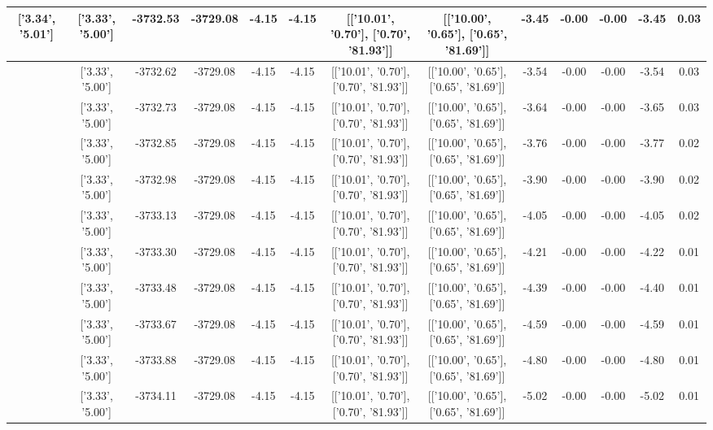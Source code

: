\begin{table}[htbp]
\begin{adjustbox}{angle=90}
\begin{tabular}{|c|c|c|c|c|c|c|c|c|c|c|c|c|}
 ['3.34', '5.01'] & ['3.33', '5.00'] & -3732.53 & -3729.08 & -4.15 & -4.15 & [['10.01', '0.70'], ['0.70', '81.93']] & [['10.00', '0.65'], ['0.65', '81.69']] & -3.45 & -0.00 & -0.00 & -3.45 & 0.03\\ \hline
 ['3.34', '5.01'] & ['3.33', '5.00'] & -3732.62 & -3729.08 & -4.15 & -4.15 & [['10.01', '0.70'], ['0.70', '81.93']] & [['10.00', '0.65'], ['0.65', '81.69']] & -3.54 & -0.00 & -0.00 & -3.54 & 0.03\\ \hline
 ['3.34', '5.01'] & ['3.33', '5.00'] & -3732.73 & -3729.08 & -4.15 & -4.15 & [['10.01', '0.70'], ['0.70', '81.93']] & [['10.00', '0.65'], ['0.65', '81.69']] & -3.64 & -0.00 & -0.00 & -3.65 & 0.03\\ \hline
 ['3.34', '5.01'] & ['3.33', '5.00'] & -3732.85 & -3729.08 & -4.15 & -4.15 & [['10.01', '0.70'], ['0.70', '81.93']] & [['10.00', '0.65'], ['0.65', '81.69']] & -3.76 & -0.00 & -0.00 & -3.77 & 0.02\\ \hline
 ['3.34', '5.01'] & ['3.33', '5.00'] & -3732.98 & -3729.08 & -4.15 & -4.15 & [['10.01', '0.70'], ['0.70', '81.93']] & [['10.00', '0.65'], ['0.65', '81.69']] & -3.90 & -0.00 & -0.00 & -3.90 & 0.02\\ \hline
 ['3.34', '5.01'] & ['3.33', '5.00'] & -3733.13 & -3729.08 & -4.15 & -4.15 & [['10.01', '0.70'], ['0.70', '81.93']] & [['10.00', '0.65'], ['0.65', '81.69']] & -4.05 & -0.00 & -0.00 & -4.05 & 0.02\\ \hline
 ['3.34', '5.01'] & ['3.33', '5.00'] & -3733.30 & -3729.08 & -4.15 & -4.15 & [['10.01', '0.70'], ['0.70', '81.93']] & [['10.00', '0.65'], ['0.65', '81.69']] & -4.21 & -0.00 & -0.00 & -4.22 & 0.01\\ \hline
 ['3.35', '5.01'] & ['3.33', '5.00'] & -3733.48 & -3729.08 & -4.15 & -4.15 & [['10.01', '0.70'], ['0.70', '81.93']] & [['10.00', '0.65'], ['0.65', '81.69']] & -4.39 & -0.00 & -0.00 & -4.40 & 0.01\\ \hline
 ['3.35', '5.01'] & ['3.33', '5.00'] & -3733.67 & -3729.08 & -4.15 & -4.15 & [['10.01', '0.70'], ['0.70', '81.93']] & [['10.00', '0.65'], ['0.65', '81.69']] & -4.59 & -0.00 & -0.00 & -4.59 & 0.01\\ \hline
 ['3.35', '5.01'] & ['3.33', '5.00'] & -3733.88 & -3729.08 & -4.15 & -4.15 & [['10.01', '0.70'], ['0.70', '81.93']] & [['10.00', '0.65'], ['0.65', '81.69']] & -4.80 & -0.00 & -0.00 & -4.80 & 0.01\\ \hline
 ['3.35', '5.02'] & ['3.33', '5.00'] & -3734.11 & -3729.08 & -4.15 & -4.15 & [['10.01', '0.70'], ['0.70', '81.93']] & [['10.00', '0.65'], ['0.65', '81.69']] & -5.02 & -0.00 & -0.00 & -5.02 & 0.01\\ \hline

\end{tabular}
\end{adjustbox}
\end{table}
